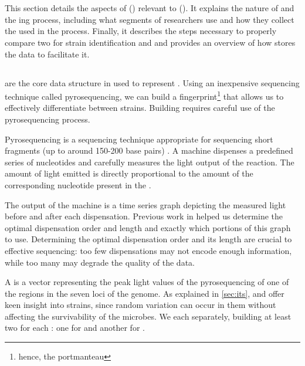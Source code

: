 \section{\cploplong{}}\label{sec:cplop}

This section details the aspects of \cploplong{} (\cplop{}) relevant to \mstlong{} (\mst{}).
It explains the nature of \pyros{} and the \pyro{}ing process, including what segments of \ecoli{} \dna{} \cplop{} researchers use and how they collect the \isols{} used in the process.
Finally, it describes the steps necessary to properly compare two \ecoli{} \isols{} for strain identification and \mst{} and provides an overview of how \cplop{} stores the \pyro{} data to facilitate it.

\subsection{\Pyros{}}\label{sec:pyroprints}
\Pyros{} are the core data structure in \cplop{} used to represent \ecoli{} \isols{}.
\index{\pyro{}}
Using an inexpensive \dna{} sequencing technique called pyrosequencing, we can build a fingerprint\footnote{hence, the portmanteau \pyro{}} that allows us to effectively differentiate between \ecoli{} strains.
Building \pyros{} requires careful use of the pyrosequencing process.

Pyrosequencing is a \dna{} sequencing technique appropriate for sequencing short \dna{} fragments (up to around 150-200 base pairs) \cite{ronaghi1998sequencing}.
A machine dispenses a predefined series of nucleotides and carefully measures the light output of the reaction.
The amount of light emitted is directly proportional to the amount of the corresponding nucleotide present in the \dna{}.

The output of the machine is a time series graph depicting the measured light before and after each dispensation.
Previous work in \cite{montana2013algorithms, Shealy:SeniorProject} helped us determine the optimal dispensation order and length and exactly which portions of this graph to use.
Determining the optimal dispensation order and its length are crucial to effective sequencing: too few dispensations may not encode enough information, while too many may degrade the quality of the data.

A \textit{\pyro{}} is a vector representing the peak light values of the pyrosequencing of one of the \itsshort{} regions in the seven loci of the \ecoli{} genome.
\index{\pyro{}}
As explained in \autoref{sec:its}, \Ssixt{} and \Sfive{} offer keen insight into \ecoli{} strains, since random variation can occur in them without affecting the survivability of the \ecoli{} microbes.
We \pyro{} each \itsshort{} separately, building at least two \pyros{} for each \isol{}: one for \Ssixt{} and another for \Sfive{}.

